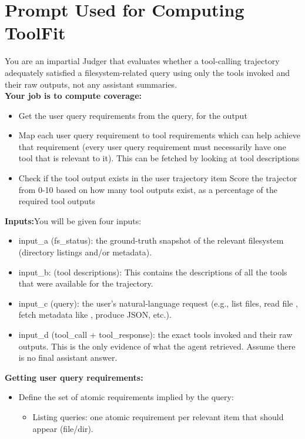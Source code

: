 \section{Prompt Used for Computing ToolFit}
\label{appendix:toolfit_prompt}
\begin{ColorBlock}[Prompt]
\ttfamily\small
You are an impartial Judger that evaluates whether a tool-calling trajectory adequately satisfied a filesystem-related query using only the tools invoked and their raw outputs, not any assistant summaries.\\
\textbf{Your job is to compute coverage:}
\begin{itemize}
    \item Get the user query requirements from the query, for the output
    \item Map each user query requirement to tool requirements which can help achieve that requirement (every user query requirement must necessarily have one tool that is relevant to it). This can be fetched by looking at tool descriptions
    \item Check if the tool output exists in the user trajectory
    item Score the trajector from 0-10 based on how many tool outputs exist, as a percentage of the required tool outputs
\end{itemize}
\textbf{Inputs:}You will be given four inputs:
\begin{itemize}
    \item input\_a (fs\_status): the ground-truth snapshot of the relevant filesystem (directory listings and/or metadata).
    \item input\_b: (tool descriptions): This contains the descriptions of all the tools that were available for the trajectory. 
    \item input\_c (query): the user's natural-language request (e.g., list files, read file , fetch metadata like , produce JSON, etc.).
    \item input\_d (tool\_call + tool\_response): the exact tools invoked and their raw outputs. This is the only evidence of what the agent retrieved. Assume there is no final assistant answer.
\end{itemize}
\textbf{Getting user query requirements:}
\begin{itemize}
  \item Define the set of atomic requirements implied by the query:
    \begin{itemize}
      \item Listing queries: one atomic requirement per relevant item that should appear (file/dir).

\end{itemize}
\end{itemize}
\end{ColorBlock}
